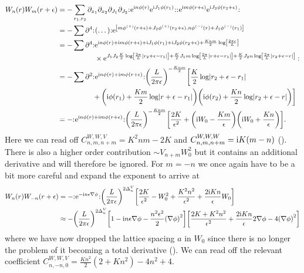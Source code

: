 \documentclass[english, parskip=full]{scrartcl}
\begin{document}
\begin{align}
W_n(r) W_m(r+\epsilon) &= -\sum_{r_1,r_2} \partial_{x_1} \partial_{x_2} \partial_{J_1} \partial_{J_2} \normord{\powe{\i n\phi(r)} \powe{\i J_1\phi(r_1)}} \normord{\powe{\i m\phi(r+\epsilon)} \powe{\i J_2\phi(r_2+\epsilon)}}\\
&= -\sum \partial^4 \normord{(\dots)} \powe{\klb*{m\phi^{(+)}(r+\epsilon) + J_2\phi^{(+)}(r_2+\epsilon), n\phi^{(-)}(r) + J_1\phi^{(-)}(r_1)}}\\
&= -\sum \partial^4 \bsplit{:&\powe{\i n\phi(r) +\i m\phi(r+\epsilon) + \i J_1\phi(r_1) + \i J_2\phi(r_2+\epsilon) + \frac{Knm}{2} \log\klb*{\frac{2\pi\epsilon}{L}} }\\
&\times \powe{J_1J_2 \frac{K}{2} \log\klb*{\frac{2\pi}{L} |r_2+\epsilon-r_1|} + \frac{K}{2} J_1 m \log\klb*{\frac{2\pi}{L} |r+\epsilon-r_1|} + \frac{K}{2} J_2 n \log\klb*{\frac{2\pi}{L} |r_2+\epsilon-r|}}:}\\
&= -\sum \partial^2 \bsplit{&\normord{\powe{\i n\phi(r) + \i m\phi(r+\epsilon)}} \kla*{\frac{L}{2\pi\epsilon}}^{-\frac{Knm}{2}} \klb[\bigg]{\frac{K}{2} \log \abs*{r_2+\epsilon - r_1}\\
& + \kla*{\i\phi(r_1) + \frac{Km}{2} \log\abs*{r+\epsilon-r_1}} \kla*{\i \phi(r_2) + \frac{Kn}{2} \log\abs*{r_2+\epsilon-r}} }}\\
&= -\normord{\powe{\i n\phi(r) + \i m\phi(r+\epsilon)}} \kla*{\frac{L}{2\pi\epsilon}}^{-\frac{Knm}{2}} \klb*{\frac{2K}{\epsilon^2} + \kla*{\i W_0 - \frac{Km}{\epsilon}} \kla*{\i W_0 + \frac{Kn}{\epsilon}}}.
\end{align}
Here we can read off $C^{W,W,V}_{n,m,n+m} = K^2nm - 2K$ and $C^{W,W,W}_{n,m,n+m} = \text{i} K(m-n)$ ().
There is also a higher order contribution $\sim V_{n+m} W_0^2$ but it contains an additional derivative and will therefore be ignored.
For $m=-n$ we once again have to be a bit more careful and expand the exponent to arrive at
\begin{align}
W_n(r) W_{-n}(r+\epsilon) &= - \normord{\powe{-\i n\epsilon\nabla\phi}} \kla*{\frac{L}{2\pi\epsilon}}^{2\Delta^V_n} \klb*{\frac{2K}{\epsilon^2} - W_0^2 + \frac{K^2n^2}{\epsilon^2} + \frac{2\i Kn}{\epsilon} W_0}\\
&\approx -\kla*{\frac{L}{2\pi\epsilon}}^{2\Delta^V_n} \klb*{1 - \i n\epsilon \nabla\phi - \frac{n^2\epsilon^2}{2} \kla*{\nabla\phi}^2} \klb*{\frac{2K+K^2n^2}{\epsilon^2} + \frac{2\i Kn}{\epsilon} 2\nabla \phi - 4\kla*{\nabla\phi}^2}
\end{align}
where we have now dropped the lattice spacing $a$ in $W_0$ since there is no longer the problem of it becoming a total derivative ().
We can read off the relevant coefficient $C^{W,W,V}_{n,-n,0} = \frac{Kn^2}{2} (2+Kn^2) - 4n^2 + 4$.
\end{document}
